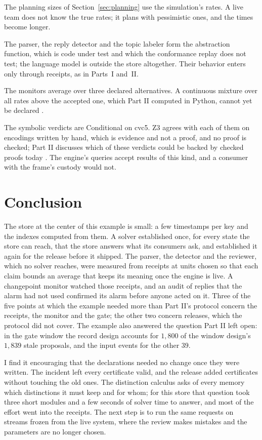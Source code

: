\documentclass[11pt]{article}
\theoremstyle{definition}
\theoremstyle{plain}
\begin{document}
The planning sizes of Section~\ref{sec:planning} use the simulation's rates. A live team does not
know the true rates; it plans with pessimistic ones, and the times become longer.

The parser, the reply detector and the topic labeler form the abstraction function, which is code
under test and which the conformance replay does not test; the language model is outside the store
altogether. Their behavior enters only through receipts, as in Parts~I and~II.

The monitors average over three declared alternatives. A continuous mixture over all rates above
the accepted one, which Part II computed in Python, cannot yet be declared \cite[Section~10]{part2}.

The symbolic verdicts are Conditional on cvc5. Z3 agrees with each of them on encodings written by
hand, which is evidence and not a proof, and no proof is checked; Part II discusses which of these
verdicts could be backed by checked proofs today \cite[Section~7.2]{part2}. The engine's queries
accept results of this kind, and a consumer with the frame's custody would not.

\section{Conclusion}\label{sec:conclusion}

The store at the center of this example is small: a few timestamps per key and the indexes computed
from them. A solver established once, for every state the store can reach, that the store answers
what its consumers ask, and established it again for the release before it shipped. The parser, the
detector and the reviewer, which no solver reaches, were measured from receipts at units chosen so
that each claim bounds an average that keeps its meaning once the engine is live. A changepoint monitor watched those receipts, and an
audit of replies that the alarm had not used confirmed its alarm before anyone acted on it. Three of
the five points at which the example needed more than Part II's protocol concern the receipts, the
monitor and the gate; the other two concern releases, which the protocol did not cover. The example
also answered the question Part II left open: in the gate window the record design accounts for
$1{,}800$ of the window design's $1{,}839$ stale proposals, and the input events for the other $39$.

I find it encouraging that the declarations needed no change once they were written. The incident
left every certificate valid, and the release added certificates without touching the old ones. The
distinction calculus asks of every memory which distinctions it must keep and for whom; for this
store that question took three short modules and a few seconds of solver time to answer, and most of
the effort went into the receipts. The next step is to run the same requests on streams frozen from
the live system, where the review makes mistakes and the parameters are no longer chosen.
\end{document}
